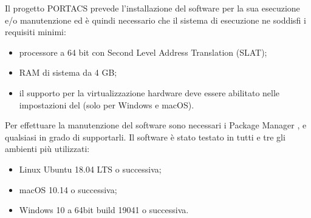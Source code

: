 Il progetto PORTACS prevede l'installazione del software  per la sua esecuzione e/o manutenzione ed è quindi necessario che il sistema di esecuzione ne soddisfi i requisiti minimi:
\begin{itemize}
	\item processore a 64 bit con Second Level Address Translation (SLAT);
	\item RAM di sistema da 4 GB;
	\item il supporto per la virtualizzazione hardware deve essere abilitato nelle impostazioni del  (solo per Windows e macOS).
\end{itemize}
Per effettuare la manutenzione del software sono necessari i Package Manager ,  e qualsiasi  in grado di supportarli.
Il software è stato testato in tutti e tre gli ambienti più utilizzati:
\begin{itemize}
	\item Linux Ubuntu 18.04 LTS o successiva; 
	\item macOS 10.14 o successiva;
	\item Windows 10 a 64bit build 19041 o successiva.
\end{itemize}  
